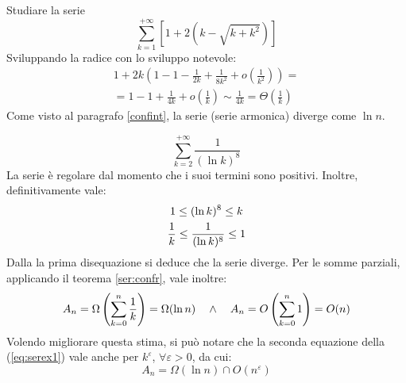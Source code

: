 \begin{examp}
	Studiare la serie
	\[
		\sum_{k=1}^{+\infty}[1+2(k-\sqrt{k+k^2})]
	\]
	Sviluppando la radice con lo sviluppo notevole:
	\begin{gather*}
		1+2k\left(1-1-\frac{1}{2k}+\frac{1}{8k^2}+o\left(\frac{1}{k^2}\right)\right)=\\
		=1-1+\frac{1}{4k}+o\left(\frac{1}{k}\right)\sim\frac{1}{4k}=\Theta\left(\frac{1}{k}\right)
	\end{gather*}
	Come visto al paragrafo \ref{confint}, la serie (serie armonica) diverge come $\ln n$.
\end{examp}

\begin{examp}
	\[
		\sum_{k=2}^{+\infty}\frac{1}{(\ln k)^8}
	\]
	La serie è regolare dal momento che i suoi termini sono positivi. Inoltre, definitivamente vale:
	\begin{gather}
		\label{eq:serex1}
		1\leq(\ln k)^8\leq k\\
		\frac{1}{k}\leq\frac{1}{(\ln k)^8}\leq 1\notag
	\end{gather}
	Dalla la prima disequazione si deduce che la serie diverge. Per le somme parziali, applicando il teorema \ref{ser:confr}, vale inoltre:
	\[
		A_n=\Omega\left(\sum_{k=0}^n \frac{1}{k}\right)=\Omega(\ln n) \quad\land\quad A_n=O\left(\sum_{k=0}^n 1\right)=O(n)\\
	\]
	Volendo migliorare questa stima, si può notare che la seconda equazione della (\ref{eq:serex1}) vale anche per $k^\varepsilon$, $\forall\varepsilon>0$, da cui:
	\[
		A_n=\Omega(\ln n)\cap O(n^\varepsilon)
	\]
\end{examp}


